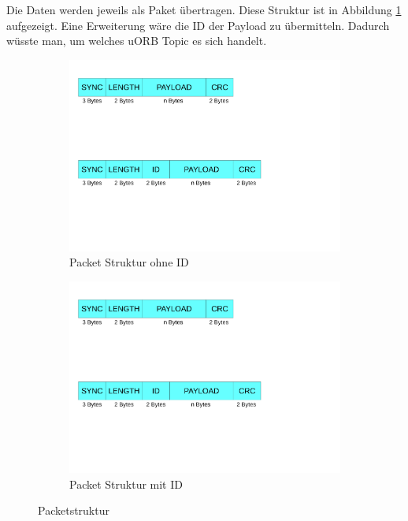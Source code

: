 \noindent Die Daten werden jeweils als Paket übertragen. Diese Struktur ist in Abbildung \ref{fig:packet1} aufgezeigt. Eine Erweiterung wäre die ID der Payload zu übermitteln. Dadurch wüsste man, um welches uORB Topic es sich handelt.

\begin{figure}[ht]
	\begin{center}
		\begin{subfigure}{0.49\textwidth}
		\includegraphics[scale=0.5, trim={0.5cm 16cm 11cm 2cm},clip]{pic/50_app/packet.pdf}
  \caption{Packet Struktur ohne ID}
  \label{fig:packet1}
		\end{subfigure}
		
		\begin{subfigure}{0.49\textwidth}
\includegraphics[scale=0.5, trim={0.5cm 7cm 1cm 10.5cm},clip]{pic/50_app/packet.pdf}
  \caption{Packet Struktur mit ID}
  \label{fig:packet2}
		\end{subfigure}
		
		\caption{Packetstruktur}
		\label{fig:Packet Struktur}
	\end{center}
\end{figure}


